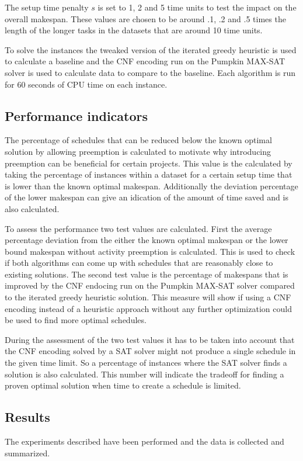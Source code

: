 The setup time penalty \(s\) is set to 1, 2 and 5 time units to test the impact on the overall makespan. These values are chosen to be around .1, .2 and .5 times the length of the longer tasks in the datasets that are around 10 time units.

To solve the instances the tweaked version of the iterated greedy heuristic is used to calculate a baseline and the CNF encoding run on the Pumpkin MAX-SAT solver is used to calculate data to compare to the baseline. Each algorithm is run for 60 seconds of CPU time on each instance.

\subsection{Performance indicators}
The percentage of schedules that can be reduced below the known optimal solution by allowing preemption is calculated to motivate why introducing preemption can be beneficial for certain projects. This value is the calculated by taking the percentage of instances within a dataset for a certain setup time that is lower than the known optimal makespan. Additionally the deviation percentage of the lower makespan can give an idication of the amount of time saved and is also calculated.

To assess the performance two test values are calculated. First the average percentage deviation from the either the known optimal makespan or the lower bound makespan without activity preemption is calculated. This is used to check if both algorithms can come up with schedules that are reasonably close to existing solutions. The second test value is the percentage of makespans that is improved by the CNF endocing run on the Pumpkin MAX-SAT solver compared to the iterated greedy heuristic solution. This measure will show if using a CNF encoding instead of a heuristic approach without any further optimization could be used to find more optimal schedules.

During the assessment of the two test values it has to be taken into account that the CNF encoding solved by a SAT solver might not produce a single schedule in the given time limit. So a percentage of instances where the SAT solver finds a solution is also calculated. This number will indicate the tradeoff for finding a proven optimal solution when time to create a schedule is limited.

\subsection{Results}
The experiments described have been performed and the data is collected and summarized.

